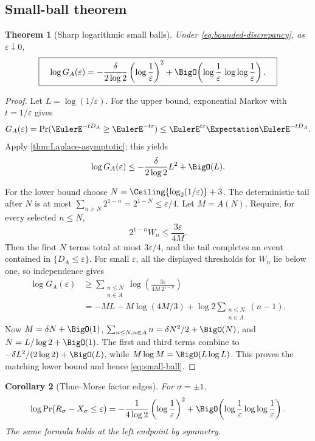 \documentclass[11pt,oneside]{article}
\numberwithin{equation}{section}
\newtheorem{theorem}{Theorem}[section]
\newtheorem{corollary}[theorem]{Corollary}
\theoremstyle{definition}
\theoremstyle{remark}
\newcommand{\eps}{\varepsilon}
\begin{document}
\subsection{Small-ball theorem}

\begin{theorem}[Sharp logarithmic small balls]
\label{thm:small-ball}
Under \eqref{eq:bounded-discrepancy}, as $\eps\downarrow0$,
\begin{equation}
 \boxed{\quad
 \log G_A(\eps)
 =-\frac{\delta}{2\log2}
 \left(\log\frac1\eps\right)^2
 +\BigO\!\left(
 \log\frac1\eps\,\log\log\frac1\eps
 \right).
 \quad}
 \label{eq:small-ball}
\end{equation}
\end{theorem}

\begin{proof}
Let $L=\log(1/\eps)$.  For the upper bound, exponential Markov with $t=1/\eps$ gives
\[
 G_A(\eps)
 =\Pr(\EulerE^{-tD_A}\ge\EulerE^{-t\eps})
 \le\EulerE^{t\eps}\Expectation\EulerE^{-tD_A}.
\]
Apply \cref{thm:Laplace-asymptotic}; this yields
\[
 \log G_A(\eps)
 \le-\frac{\delta}{2\log2}L^2+\BigO(L).
\]

For the lower bound choose
$N=\Ceiling{\log_2(1/\eps)}+3$.  The deterministic tail after $N$ is at most
\(
 \sum_{n>N}2^{1-n}=2^{1-N}\le\eps/4.
\)
Let $M=A(N)$.  Require, for every selected $n\le N$,
\[
 2^{1-n}W_n\le\frac{3\eps}{4M}.
\]
Then the first $N$ terms total at most $3\eps/4$, and the tail completes an event contained
in $\{D_A\le\eps\}$.  For small $\eps$, all the displayed thresholds for $W_n$ lie below
one, so independence gives
\begin{align}
 \log G_A(\eps)
 &\ge\sum_{\substack{n\le N\\n\in A}}
 \log\left(\frac{3\eps}{4M\,2^{1-n}}\right)\\
 &=-ML-M\log(4M/3)+\log2
 \sum_{\substack{n\le N\\n\in A}}(n-1).
 \label{eq:small-ball-lower}
\end{align}
Now $M=\delta N+\BigO(1)$,
$\sum_{n\le N,n\in A}n=\delta N^2/2+\BigO(N)$, and
$N=L/\log2+\BigO(1)$.  The first and third terms combine to
$-\delta L^2/(2\log2)+\BigO(L)$, while $M\log M=\BigO(L\log L)$.  This proves the matching
lower bound and hence \eqref{eq:small-ball}.
\end{proof}

\begin{corollary}[Thue--Morse factor edges]
\label{cor:tm-small-ball}
For $\sigma=\pm1$,
\begin{equation}
 \log\Pr(R_\sigma-X_\sigma\le\eps)
 =-\frac1{4\log2}\left(\log\frac1\eps\right)^2
 +\BigO\!\left(\log\frac1\eps\log\log\frac1\eps\right).
 \label{eq:tm-small-ball}
\end{equation}
The same formula holds at the left endpoint by symmetry.
\end{corollary}
\end{document}
